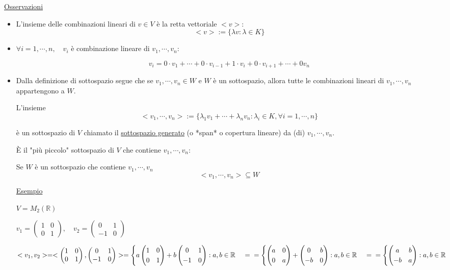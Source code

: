 \documentclass{article}
\newcommand{\ul}[1]{\underline{#1}}
\newcommand{\R}{\mathbb{R}}
\begin{document}
\ul{Osservazioni}
\begin{itemize}
	\item L'insieme delle combinazioni lineari di $v\in V$ è la retta vettoriale $<v>$:
	  $$<v>:=\{\lambda v:\lambda\in K\}$$
	\item $\forall i=1,\cdots,n,\quad v_i$ è combinazione lineare di $v_1,\cdots,v_n$:

	  $$v_i=0\cdot v_1+\cdots+0\cdot v_{i-1}+1\cdot v_i+0\cdot v_{i+1}+\cdots+0v_n$$
	\item Dalla definizione di sottospazio segue che se $v_1,\cdots,v_n\in W$ e $W$ è un sottospazio, allora tutte le combinazioni lineari di $v_1,\cdots,v_n$ appartengono a $W$.

	  L'insieme
	  $$<v_1,\cdots,v_n>:=\{\lambda_1v_1+\cdots+\lambda_nv_n:\lambda_i\in K,\forall i=1,\cdots,n\}$$

	  è un sottospazio di $V$ chiamato il \ul{sottospazio generato} (o *span* o copertura lineare) da (di) $v_1,\cdots,v_n$.

	  È il "più piccolo" sottospazio di $V$ che contiene $v_1,\cdots,v_n$:

	  Se $W$ è un sottospazio che contiene $v_1,\cdots,v_n$
	  $$<v_1,\cdots,v_n>\subseteq W$$

	  \ul{Esempio}

	  $V=M_2(\R)$

	  $v_1=\begin{pmatrix}1&0\\0&1\end{pmatrix},\quad v_2=\begin{pmatrix}0&1\\-1&0\end{pmatrix}$

	  $<v_1,v_2>=<\begin{pmatrix}1&0\\0&1\end{pmatrix},\begin{pmatrix}0&1\\-1&0\end{pmatrix}>=\begin{cases}a\begin{pmatrix}1&0\\0&1\end{pmatrix}+b\begin{pmatrix}0&1\\-1&0\end{pmatrix}:a,b\in\R\end{cases}=\\=\begin{cases}\begin{pmatrix}a&0\\0&a\end{pmatrix}+\begin{pmatrix}0&b\\-b&0\end{pmatrix}:a,b\in\R\end{cases}=\\=\begin{cases}\begin{pmatrix}a&b\\-b&a\end{pmatrix}:a,b\in\R\end{cases}$


\end{itemize}
\end{document}
